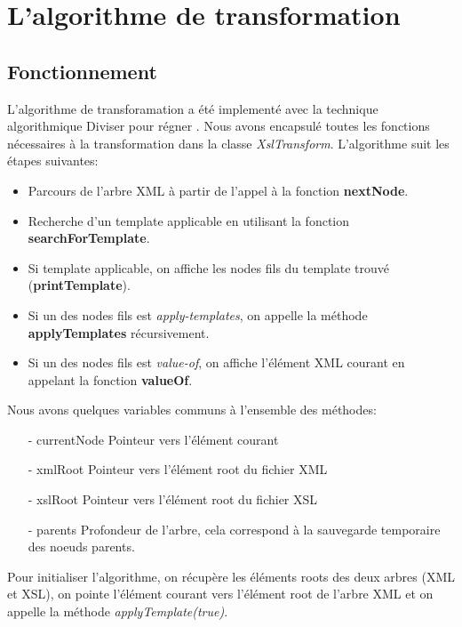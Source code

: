 \section{L'algorithme de transformation}
	\subsection {Fonctionnement}
	L'algorithme de transforamation a été implementé avec la 
	technique algorithmique \og Diviser pour régner \fg. Nous avons
	encapsulé toutes les fonctions nécessaires à la transformation 
	dans la classe \textit {XslTransform}. 
	L'algorithme suit les étapes suivantes: \\

	\begin{itemize}
	\item Parcours de l'arbre XML à partir de l'appel à la fonction 
		\textbf{nextNode}.
	\item Recherche d'un template applicable en utilisant la fonction 
		\textbf{searchForTemplate}.
	\item Si template applicable, on affiche les nodes fils du 
		template trouvé (\textbf{printTemplate}).
	\item Si un des nodes fils est \textit{apply-templates}, on
		appelle la méthode \textbf{applyTemplates} récursivement.
	\item Si un des nodes fils est \textit{value-of}, on
		affiche l'élément XML courant en appelant la fonction
		\textbf{valueOf}. \\
	\end{itemize}	
	
	Nous avons quelques variables communs à l'ensemble des méthodes:
	
	\begin{itemize}
		\item[- currentNode] Pointeur vers l'élément courant
		\item[- xmlRoot] Pointeur vers l'élément root du fichier XML
		\item[- xslRoot] Pointeur vers l'élément root du fichier XSL
		\item[- parents] Profondeur de l'arbre, cela
		correspond à la sauvegarde temporaire des noeuds parents. \\
	\end{itemize}
	
	
	Pour initialiser l'algorithme, on récupère les éléments roots
	des deux arbres (XML et XSL), on pointe l'élément courant vers
	l'élément root de l'arbre XML et on appelle la méthode 
	\textit{applyTemplate(true)}. \\ \\
	
